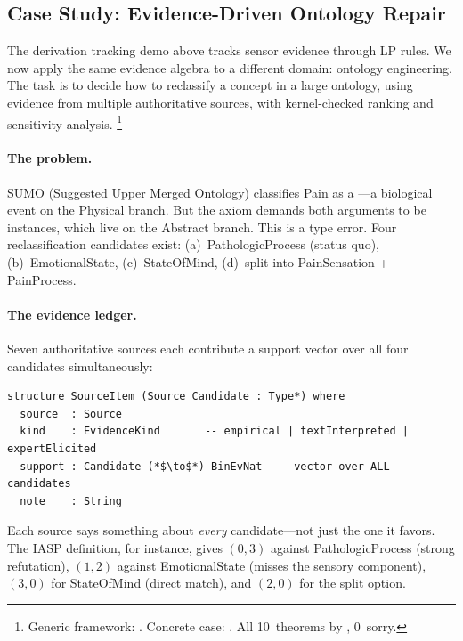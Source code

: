 \documentclass[11pt,openany]{report}
\begin{document}
\subsection{Case Study: Evidence-Driven Ontology Repair}
\label{sec:pain-evidence-wm}

The derivation tracking demo above tracks sensor evidence through
LP rules.  We now apply the same evidence algebra to a different
domain: ontology engineering.  The task is to decide how to
reclassify a concept in a large ontology, using evidence from
multiple authoritative sources, with kernel-checked ranking and
sensitivity analysis.%
\footnote{Generic framework:
.
Concrete case:
.
All 10~theorems by , 0~sorry.}

\paragraph{The problem.}
SUMO (Suggested Upper Merged Ontology) classifies Pain as a
---a biological event on the Physical
branch.  But the axiom 
demands both arguments to be  instances, which
live on the Abstract branch.  This is a type error.  Four
reclassification candidates exist: (a)~PathologicProcess (status
quo), (b)~EmotionalState, (c)~StateOfMind, (d)~split into
PainSensation + PainProcess.

\paragraph{The evidence ledger.}
Seven authoritative sources each contribute a support vector over
all four candidates simultaneously:

\begin{lstlisting}[language={}]
structure SourceItem (Source Candidate : Type*) where
  source  : Source
  kind    : EvidenceKind       -- empirical | textInterpreted | expertElicited
  support : Candidate (*$\to$*) BinEvNat  -- vector over ALL candidates
  note    : String
\end{lstlisting}

\noindent
Each source says something about \emph{every} candidate---not
just the one it favors.  The IASP definition, for instance, gives
$(0, 3)$ against PathologicProcess (strong refutation), $(1, 2)$
against EmotionalState (misses the sensory component), $(3, 0)$
for StateOfMind (direct match), and $(2, 0)$ for the split option.
\end{document}
